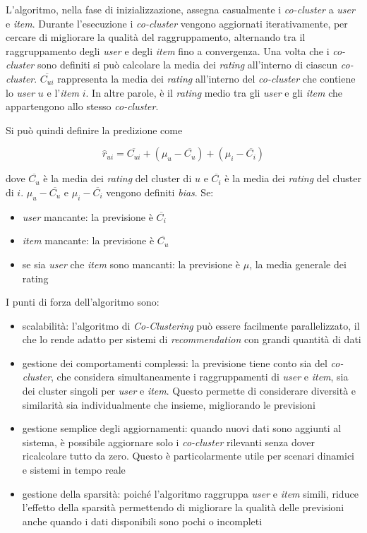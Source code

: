 L'algoritmo, nella fase di inizializzazione, assegna casualmente i \textit{co-cluster} a \textit{user} e \textit{item}. Durante l'esecuzione i \textit{co-cluster} vengono aggiornati iterativamente, per cercare di migliorare la qualità del raggruppamento, alternando tra il raggruppamento degli \textit{user} e degli \textit{item} fino a convergenza. Una volta che i \textit{co-cluster} sono definiti si può calcolare la media dei \textit{rating} all'interno di ciascun \textit{co-cluster}. $ \overline{C_{ui}} $ rappresenta la media dei \textit{rating} all'interno del \textit{co-cluster} che contiene lo \textit{user} $u$ e l'\textit{item} $i$. In altre parole, è il \textit{rating} medio tra gli \textit{user} e gli \textit{item} che appartengono allo stesso \textit{co-cluster}.

Si può quindi definire la predizione come

\[
\hat{r}_{ui} = \overline{C_{ui}} + (\mu_u - \overline{C_u}) + (\mu_i - \overline{C_i})
\]

dove $\overline{C_u}$ è la media dei \textit{rating} del cluster di $u$ e $\overline{C_i}$ è la media dei \textit{rating} del cluster di $i$. $ \mu_u - \overline{C_u} $ e $ \mu_i - \overline{C_i} $ vengono definiti \textit{bias}. Se: 
\begin{itemize}
  \item \textit{user} mancante: la previsione è $ \overline{C_i} $
  \item \textit{item} mancante: la previsione è $ \overline{C_u} $
  \item se sia \textit{user} che \textit{item} sono mancanti: la previsione è $ \mu $, la media generale dei rating
\end{itemize}

I punti di forza dell'algoritmo sono:

\begin{itemize}
  \item scalabilità: l'algoritmo di \textit{Co-Clustering} può essere facilmente parallelizzato, il che lo rende adatto per sistemi di \textit{recommendation} con grandi quantità di dati
  \item gestione dei comportamenti complessi: la previsione tiene conto sia del \textit{co-cluster}, che considera simultaneamente i raggruppamenti di \textit{user} e \textit{item}, sia dei cluster singoli per \textit{user} e \textit{item}. Questo permette di considerare diversità e similarità sia individualmente che insieme, migliorando le previsioni
  \item gestione semplice degli aggiornamenti: quando nuovi dati sono aggiunti al sistema, è possibile aggiornare solo i \textit{co-cluster} rilevanti senza dover ricalcolare tutto da zero. Questo è particolarmente utile per scenari dinamici e sistemi in tempo reale
  \item gestione della sparsità: poiché l'algoritmo raggruppa \textit{user} e \textit{item} simili, riduce l'effetto della sparsità permettendo di migliorare la qualità delle previsioni anche quando i dati disponibili sono pochi o incompleti
\end{itemize}

